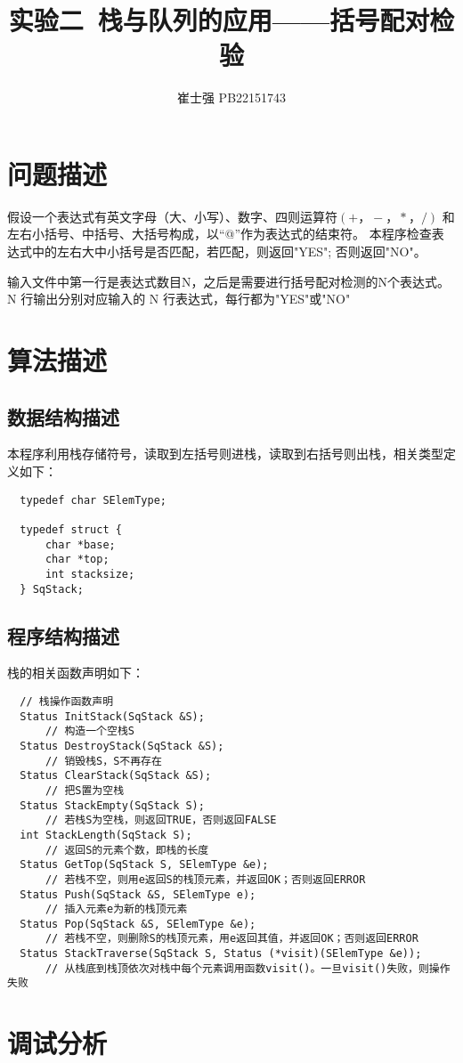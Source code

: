 \documentclass[UTF8]{ctexart}
\title{实验二\ 栈与队列的应用——括号配对检验}
\author{崔士强 PB22151743}
\date{}
\begin{document}
\maketitle

\section{问题描述}
假设一个表达式有英文字母（大、小写）、数字、四则运算符$(+，-，*，/)$
和左右小括号、中括号、大括号构成，以“@”作为表达式的结束符。
本程序检查表达式中的左右大中小括号是否匹配，若匹配，则返回"YES"; 否则返回"NO"。

输入文件中第一行是表达式数目N，之后是需要进行括号配对检测的N个表达式。
N 行输出分别对应输入的 N 行表达式，每行都为"YES"或"NO"
\section{算法描述}
\subsection{数据结构描述}
本程序利用栈存储符号，读取到左括号则进栈，读取到右括号则出栈，相关类型定义如下：
\begin{lstlisting}
  typedef char SElemType;

  typedef struct {
      char *base;
      char *top;
      int stacksize;
  } SqStack;
\end{lstlisting}
\subsection{程序结构描述}
栈的相关函数声明如下：
\begin{lstlisting}
  // 栈操作函数声明
  Status InitStack(SqStack &S);
      // 构造一个空栈S
  Status DestroyStack(SqStack &S);
      // 销毁栈S，S不再存在
  Status ClearStack(SqStack &S);
      // 把S置为空栈
  Status StackEmpty(SqStack S);
      // 若栈S为空栈，则返回TRUE，否则返回FALSE
  int StackLength(SqStack S);
      // 返回S的元素个数，即栈的长度
  Status GetTop(SqStack S, SElemType &e);
      // 若栈不空，则用e返回S的栈顶元素，并返回OK；否则返回ERROR
  Status Push(SqStack &S, SElemType e);
      // 插入元素e为新的栈顶元素
  Status Pop(SqStack &S, SElemType &e);
      // 若栈不空，则删除S的栈顶元素，用e返回其值，并返回OK；否则返回ERROR
  Status StackTraverse(SqStack S, Status (*visit)(SElemType &e));
      // 从栈底到栈顶依次对栈中每个元素调用函数visit()。一旦visit()失败，则操作失败
\end{lstlisting}
\section{调试分析}
\end{document}
